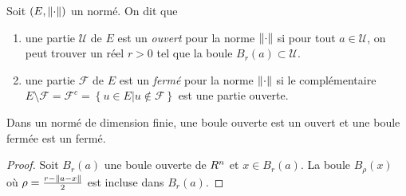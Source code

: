                                 \begin{definition}
                                    Soit $(E,\left\lVert\cdot\right\rVert)$ un \rev{} normé. On dit que 
                                    \begin{enumerate}
                                        \item une partie $\mathcal U$ de $E$ est un \emph{ouvert} pour la norme $\left\lVert\cdot\right\rVert$ si pour tout $a\in \mathcal U$, on peut trouver un réel $r>0$ tel que la boule $B_r(a) \subset \mathcal U$.  
                                        \item une partie $\mathcal F$ de $E$ est un \emph{fermé} pour la norme $\left\lVert\cdot\right\rVert$ si le complémentaire $E\setminus \mathcal F = \mathcal F^c = \left\{ u\in E| u \notin \mathcal F \right\}$ est une partie ouverte.
                                    \end{enumerate}
                                \end{definition}

                                \begin{exemple}
                                    \pl{\rep{5cm}	}
                                \end{exemple}

                                \sld{\vfill\pagebreak[5]}%
                                \begin{proposition}
                                Dans un \rev{} normé de dimension finie, une boule ouverte est un ouvert et une boule fermée est un fermé. \end{proposition}
                                \begin{proof}
                                    Soit $B_r(a)$ une boule ouverte de $R^n$ et $x\in B_r(a)$. La boule $B_\rho(x)$ où $\rho = \frac{r - \left\lVert a -x\right\rVert}{2}$ est incluse dans $B_r(a)$.
                                \end{proof}

